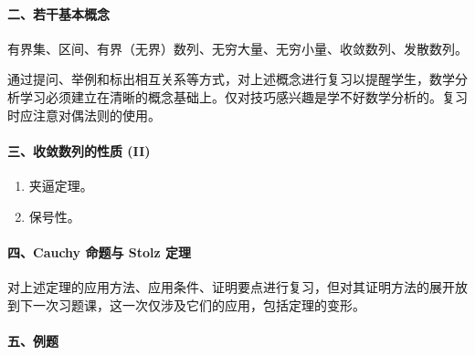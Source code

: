 \paragraph{二、若干基本概念}

有界集、区间、有界（无界）数列、无穷大量、无穷小量、收敛数列、发散数列。

通过提问、举例和标出相互关系等方式，对上述概念进行复习以提醒学生，数学分析学习必须建立在清晰的概念基础上。仅对技巧感兴趣是学不好数学分析的。复习时应注意对偶法则的使用。

\paragraph{三、收敛数列的性质 (II)}

\begin{enumerate}[label=\arabic*.]
  \item 夹逼定理。
  \item 保号性。
\end{enumerate}

\paragraph{四、Cauchy 命题与 Stolz 定理}

对上述定理的应用方法、应用条件、证明要点进行复习，但对其证明方法的展开放到下一次习题课，这一次仅涉及它们的应用，包括定理的变形。

\paragraph{五、例题}

